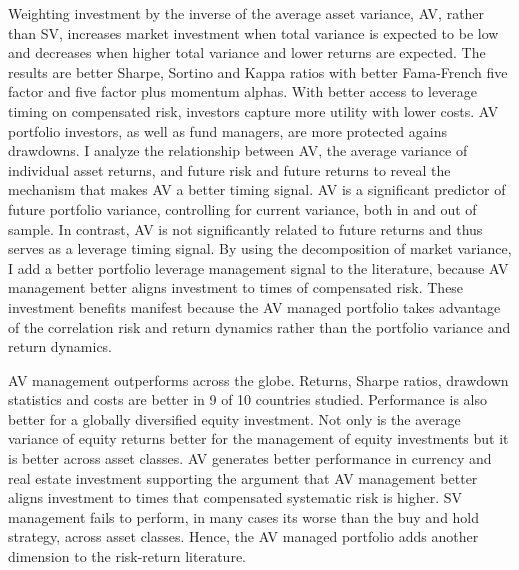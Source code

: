 Weighting investment by the inverse of the average asset variance, AV, rather than SV, increases market investment when total variance is expected to be low and decreases when higher total variance and lower returns are expected. The results are better Sharpe, Sortino and Kappa ratios with better Fama-French five factor and five factor plus momentum alphas. With better access to leverage timing on compensated risk, investors capture more utility with lower costs. AV portfolio investors, as well as fund managers, are more protected agains drawdowns. I analyze the relationship between AV, the average variance of individual asset returns, and future risk and future returns to reveal the mechanism that makes AV a better timing signal. AV is a significant predictor of future portfolio variance, controlling for current variance, both in and out of sample. In contrast, AV is not significantly related to future returns and thus serves as a leverage timing signal. By using the decomposition of market variance, I add a better portfolio leverage management signal to the literature, because AV management better aligns investment to times of compensated risk. These investment benefits manifest because the AV managed portfolio takes advantage of the correlation risk and return dynamics rather than the portfolio variance and return dynamics.

AV management outperforms across the globe. Returns, Sharpe ratios, drawdown statistics and costs are better in 9 of 10 countries studied. Performance is also better for a globally diversified equity investment. Not only is the average variance of equity returns better for the management of equity investments but it is better across asset classes. AV generates better performance in currency and real estate investment supporting the argument that AV management better aligns investment to times that compensated systematic risk is higher. SV management fails to perform, in many cases its worse than the buy and hold strategy, across asset classes. Hence, the AV managed portfolio adds another dimension to the risk-return literature.

